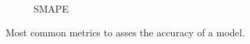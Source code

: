 \documentclass{article}
\begin{document}
\begin{figure}[ht]
\begin{subfigure}{0.32\textwidth}
        \caption{SMAPE}
        \label{fig:smape}
    \end{subfigure}
    \caption{Most common metrics to asses the accuracy of a model.}
    \label{fig:metrics}
\end{figure}


\end{document}
